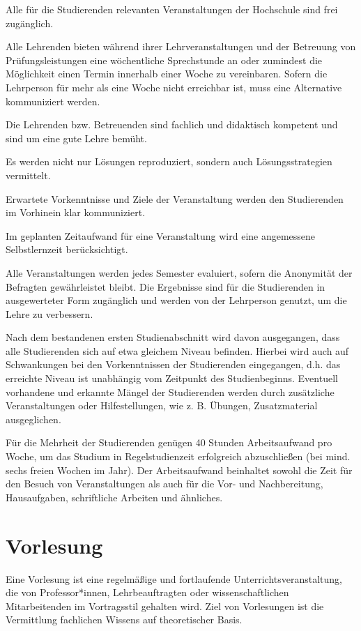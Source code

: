 Alle für die Studierenden relevanten Veranstaltungen der Hochschule sind frei zugänglich.

Alle Lehrenden bieten während ihrer Lehrveranstaltungen und der Betreuung von Prüfungsleistungen eine wöchentliche Sprechstunde an oder zumindest die Möglichkeit einen Termin innerhalb einer Woche zu vereinbaren. Sofern die Lehrperson für mehr als eine Woche nicht erreichbar ist, muss eine Alternative kommuniziert werden.

Die Lehrenden bzw. Betreuenden sind fachlich und didaktisch kompetent und sind um eine gute Lehre bemüht.

Es werden nicht nur Lösungen reproduziert, sondern auch Lösungsstrategien vermittelt.

Erwartete Vorkenntnisse und Ziele der Veranstaltung werden den Studierenden im Vorhinein klar kommuniziert.

Im geplanten Zeitaufwand für eine Veranstaltung wird eine angemessene Selbstlernzeit berücksichtigt.

Alle Veranstaltungen werden jedes Semester evaluiert, sofern die Anonymität der Befragten gewährleistet bleibt. Die Ergebnisse sind für die Studierenden in ausgewerteter Form zugänglich und werden von der Lehrperson genutzt, um die Lehre zu verbessern.

Nach dem bestandenen ersten Studienabschnitt wird davon ausgegangen, dass alle Studierenden sich auf etwa gleichem Niveau befinden. Hierbei wird auch auf Schwankungen bei den Vorkenntnissen der Studierenden eingegangen, d.h. das erreichte Niveau ist unabhängig vom Zeitpunkt des Studienbeginns. Eventuell vorhandene und erkannte Mängel der Studierenden werden durch zusätzliche Veranstaltungen oder Hilfestellungen, wie z. B. Übungen, Zusatzmaterial ausgeglichen.

Für die Mehrheit der Studierenden genügen 40 Stunden Arbeitsaufwand pro Woche, um das Studium in Regelstudienzeit erfolgreich abzuschließen (bei mind. sechs freien Wochen im Jahr). Der Arbeitsaufwand beinhaltet sowohl die Zeit für den Besuch von Veranstaltungen als auch für die Vor- und Nachbereitung, Hausaufgaben, schriftliche Arbeiten und ähnliches.

\section{Vorlesung}
\label{sec:vorlesung}

Eine Vorlesung ist eine regelmäßige und fortlaufende Unterrichtsveranstaltung, die von Professor*innen, Lehrbeauftragten oder wissenschaftlichen Mitarbeitenden im Vortragsstil gehalten wird. Ziel von Vorlesungen ist die Vermittlung fachlichen Wissens auf theoretischer Basis.

